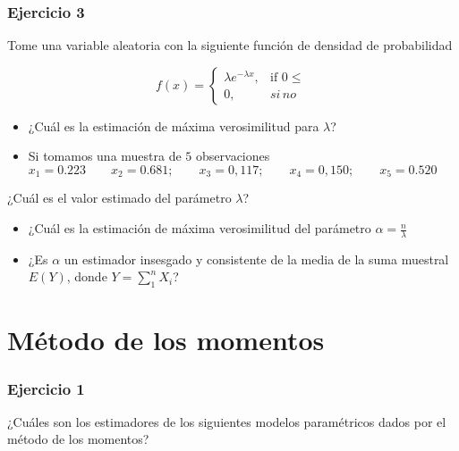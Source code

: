 \documentclass[
]{book}
\begin{document}
\hypertarget{ejercicio-3-6}{%
\subsubsection{Ejercicio 3}\label{ejercicio-3-6}}

Tome una variable aleatoria con la siguiente función de densidad de probabilidad

\[
    f(x)= 
\begin{cases}
    \lambda e^{-\lambda x},& \text{if } 0 \leq\\
    0,& si\, no  
\end{cases}
\]

\begin{itemize}
\item
  ¿Cuál es la estimación de máxima verosimilitud para \(\lambda\)?
\item
  Si tomamos una muestra de \(5\) observaciones
  \(x_1 = 0.223 \qquad x_2 = 0.681; \qquad x_3 = 0,117; \qquad x_4 = 0,150; \qquad x_5 = 0.520\)
\end{itemize}

¿Cuál es el valor estimado del parámetro \(\lambda\)?

\begin{itemize}
\item
  ¿Cuál es la estimación de máxima verosimilitud del parámetro \(\alpha=\frac{n}{\lambda}\)
\item
  ¿Es \(\alpha\) un estimador insesgado y consistente de la media de la suma muestral \(E(Y)\), donde \(Y=\sum_1^n X_i\)?
\end{itemize}

\hypertarget{muxe9todo-de-los-momentos-1}{%
\section{Método de los momentos}\label{muxe9todo-de-los-momentos-1}}

\hypertarget{ejercicio-1-10}{%
\subsubsection{Ejercicio 1}\label{ejercicio-1-10}}

¿Cuáles son los estimadores de los siguientes modelos paramétricos dados por el método de los momentos?
\end{document}
